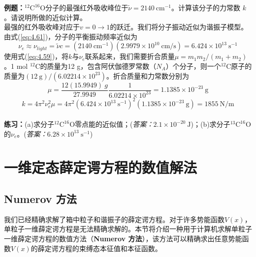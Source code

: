     \begin{examplebox}
        \textbf{例题：}$^{12}\mathrm{C}^{16}\mathrm{O}$分子的最强红外吸收峰位于$\tilde{\nu} = 2140 \:\mathrm{cm}^{-1}$。计算该分子的力常数 $k$。请说明所做的近似计算。\\
        
        最强的红外吸收峰对应于$v = 0 \to 1$的跃迁。我们将分子振动近似为谐振子模型。由式(\ref{eq:4.61})，分子的平衡振动频率近似为
        \begin{equation*}
            \nu_e \approx \nu_{light} = \tilde{\nu}c = \left(2140 \:\mathrm{cm}^{-1}\right)\left(2.9979 \times 10^{10} \:\mathrm{cm/s}\right)  = 6.424 \times 10^{13} \:\mathrm{s}^{-1}
        \end{equation*}
        使用式(\ref{eq:4.59})，将$k$与$\nu_e$联系起来，我们需要折合质量$\mu = m_1m_2/\left(m_1+m_2\right)$。1 mol $^{12}\mathrm{C}$的质量为12 g，包含阿伏伽德罗常数（$N_A$）个分子，则一个$^{12}\mathrm{C}$原子的质量为$\left(12 \: \mathrm{g} \right)/ \left(6.02214 \times 10^{23}\right)$。折合质量和力常数分别为
        \begin{equation*}
            \mu = \frac{12 \left(15.9949\right)\: g}{27.9949} \frac{1}{6.02214 \times 10^{23}} = 1.1385 \times 10^{-23} \:\mathrm{g}
        \end{equation*}
        \begin{equation*}
            k = 4\pi^2 \nu_e^2\mu = 4\pi^2 \left(6.424 \times 10^{13} \:\mathrm{s}^{-1}\right)^2\left(1.1385 \times 10^{-23} \:\mathrm{g}\right) = 1855 \: \mathrm{N} / \mathrm{m}
        \end{equation*}
        \\
        
        \textbf{练习：}(a)求分子$^{12}\mathrm{C}^{16}\mathrm{O}$零点能的近似值；(\textit{答案：}$2.1 \times 10^{-20} \:\mathrm{J}$)；(b)求分子$^{13}\mathrm{C}^{16}\mathrm{O}$的$\nu_e$。(\textit{答案：}$6.28 \times 10^{13} \:\mathrm{s}^{-1}$)
    \end{examplebox}

\section{一维定态薛定谔方程的数值解法}
\label{sec:4.4 Numerical Solutions of the One-Dimensional Time-Independent Schrödinger Equation}
\subsection*{Numerov 方法}
    我们已经精确求解了箱中粒子和谐振子的薛定谔方程。对于许多势能函数$V\left(x\right)$，单粒子一维薛定谔方程是无法精确求解的。本节将介绍一种用于计算机求解单粒子一维薛定谔方程的数值方法（\textbf{Numerov 方法}），该方法可以精确求出任意势能函数$V\left(x\right)$的薛定谔方程的束缚态本征值和本征函数。

